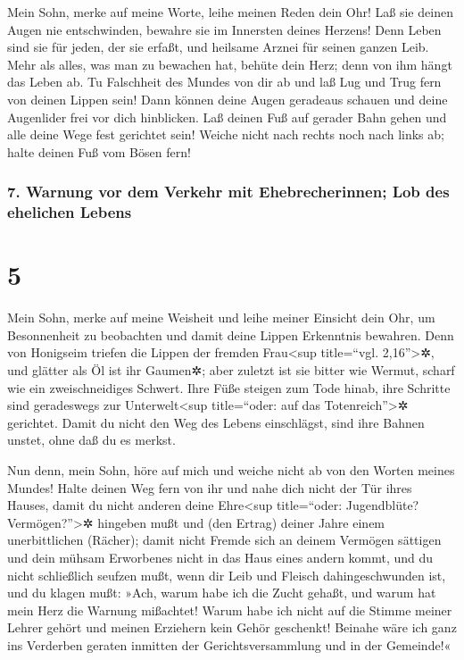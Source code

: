 Mein Sohn, merke auf meine Worte, leihe meinen Reden dein
Ohr! Laß sie deinen Augen nie entschwinden, bewahre sie
im Innersten deines Herzens! Denn Leben sind sie für
jeden, der sie erfaßt, und heilsame Arznei für seinen ganzen Leib.
Mehr als alles, was man zu bewachen hat, behüte dein
Herz; denn von ihm hängt das Leben ab. Tu Falschheit des
Mundes von dir ab und laß Lug und Trug fern von deinen Lippen sein!
Dann können deine Augen geradeaus schauen und deine
Augenlider frei vor dich hinblicken. Laß deinen Fuß auf
gerader Bahn gehen und alle deine Wege fest gerichtet sein!
Weiche nicht nach rechts noch nach links ab; halte deinen
Fuß vom Bösen fern!

\hypertarget{warnung-vor-dem-verkehr-mit-ehebrecherinnen-lob-des-ehelichen-lebens}{%
\subsubsection{7. Warnung vor dem Verkehr mit Ehebrecherinnen; Lob des
ehelichen
Lebens}\label{warnung-vor-dem-verkehr-mit-ehebrecherinnen-lob-des-ehelichen-lebens}}

\hypertarget{section-4}{%
\section{5}\label{section-4}}

Mein Sohn, merke auf meine Weisheit und leihe meiner
Einsicht dein Ohr, um Besonnenheit zu beobachten und damit
deine Lippen Erkenntnis bewahren. Denn von Honigseim
triefen die Lippen der fremden Frau\textless sup title=``vgl.
2,16''\textgreater✲, und glätter als Öl ist ihr Gaumen✲;
aber zuletzt ist sie bitter wie Wermut, scharf wie ein
zweischneidiges Schwert. Ihre Füße steigen zum Tode hinab,
ihre Schritte sind geradeswegs zur Unterwelt\textless sup title=``oder:
auf das Totenreich''\textgreater✲ gerichtet. Damit du
nicht den Weg des Lebens einschlägst, sind ihre Bahnen unstet, ohne daß
du es merkst.

Nun denn, mein Sohn, höre auf mich und weiche nicht ab von
den Worten meines Mundes! Halte deinen Weg fern von ihr
und nahe dich nicht der Tür ihres Hauses, damit du nicht
anderen deine Ehre\textless sup title=``oder: Jugendblüte?
Vermögen?''\textgreater✲ hingeben mußt und (den Ertrag) deiner Jahre
einem unerbittlichen (Rächer); damit nicht Fremde sich an
deinem Vermögen sättigen und dein mühsam Erworbenes nicht in das Haus
eines andern kommt, und du nicht schließlich seufzen
mußt, wenn dir Leib und Fleisch dahingeschwunden ist, und
du klagen mußt: »Ach, warum habe ich die Zucht gehaßt, und warum hat
mein Herz die Warnung mißachtet! Warum habe ich nicht auf
die Stimme meiner Lehrer gehört und meinen Erziehern kein Gehör
geschenkt! Beinahe wäre ich ganz ins Verderben geraten
inmitten der Gerichtsversammlung und in der Gemeinde!«

